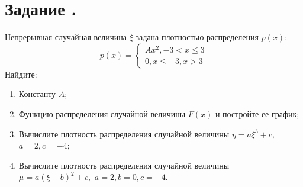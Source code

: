 \documentclass[12pt]{article}
\begin{document}
\section*{Задание .}
Непрерывная случайная величина $\xi$ задана плотностью распределения $p(x)$:
\[
	p(x) =
	\begin{cases}
		Ax^2, -3 < x \leq 3 \\
		0, x \leq -3, x > 3
	\end{cases}
\]
Найдите:
\begin{enumerate}
	\item Константу $A$;
	\item Функцию распределения случайной величины $F(x)$ и постройте ее график;
	\item Вычислите плотность распределения случайной величины $\eta = a\xi^3 + c,$ $a = 2, c = -4$;
	\item Вычислите плотность распределения случайной величины $\mu = a(\xi - b)^2 + c,$ $a = 2, b = 0, c = -4$.
\end{enumerate}
\end{document}
